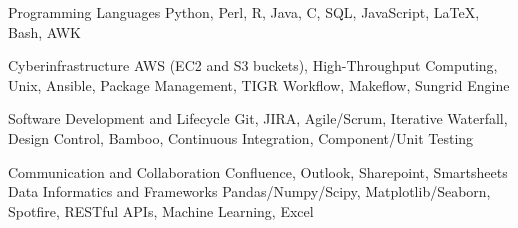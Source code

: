 

\begin{cvskills}

  \cvskill
    {Programming Languages} %
    {Python, Perl, R, Java, C, SQL, JavaScript, LaTeX, Bash, AWK} %

  \cvskill
    {Cyberinfrastructure} %
    {AWS (EC2 and S3 buckets), High-Throughput Computing, Unix, Ansible, Package Management, TIGR Workflow, Makeflow, Sungrid Engine} %

  \cvskill
    {Software Development and Lifecycle} %
    {Git, JIRA, Agile/Scrum, Iterative Waterfall, Design Control, Bamboo, Continuous Integration, Component/Unit Testing} %

    \cvskill
    {Communication and Collaboration}
    {Confluence, Outlook, Sharepoint, Smartsheets}
    \cvskill
    {Data Informatics and Frameworks}
    {Pandas/Numpy/Scipy, Matplotlib/Seaborn, Spotfire, RESTful APIs, Machine Learning, Excel}






\end{cvskills}
